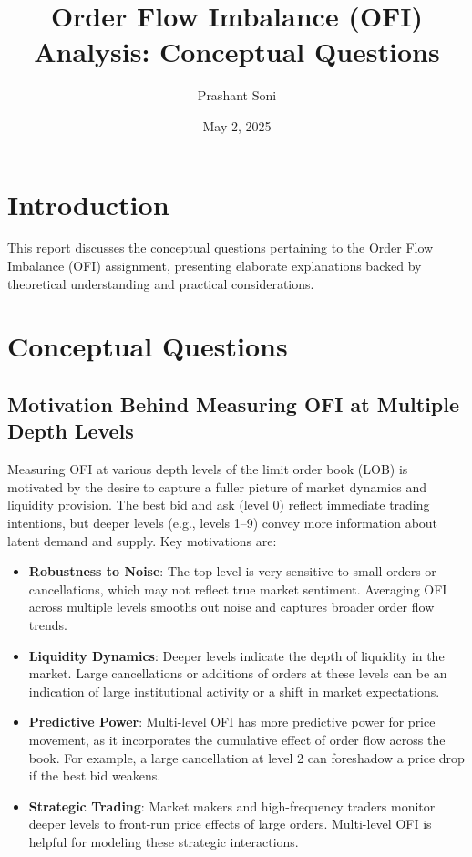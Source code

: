 \documentclass[12pt]{article}
\begin{document}
\title{Order Flow Imbalance (OFI) Analysis: Conceptual Questions}
\author{Prashant Soni}
\date{May 2, 2025}
\maketitle

\section{Introduction}
This report discusses the conceptual questions pertaining to the Order Flow Imbalance (OFI) assignment, presenting elaborate explanations backed by theoretical understanding and practical considerations.

\section{Conceptual Questions}

\subsection{Motivation Behind Measuring OFI at Multiple Depth Levels}
Measuring OFI at various depth levels of the limit order book (LOB) is motivated by the desire to capture a fuller picture of market dynamics and liquidity provision. The best bid and ask (level 0) reflect immediate trading intentions, but deeper levels (e.g., levels 1--9) convey more information about latent demand and supply. Key motivations are:

\begin{itemize}
    \item \textbf{Robustness to Noise}: The top level is very sensitive to small orders or cancellations, which may not reflect true market sentiment. Averaging OFI across multiple levels smooths out noise and captures broader order flow trends.
    \item \textbf{Liquidity Dynamics}: Deeper levels indicate the depth of liquidity in the market. Large cancellations or additions of orders at these levels can be an indication of large institutional activity or a shift in market expectations.
    \item \textbf{Predictive Power}: Multi-level OFI has more predictive power for price movement, as it incorporates the cumulative effect of order flow across the book. For example, a large cancellation at level 2 can foreshadow a price drop if the best bid weakens.
    \item \textbf{Strategic Trading}: Market makers and high-frequency traders monitor deeper levels to front-run price effects of large orders. Multi-level OFI is helpful for modeling these strategic interactions.
\end{itemize}
\end{document}
